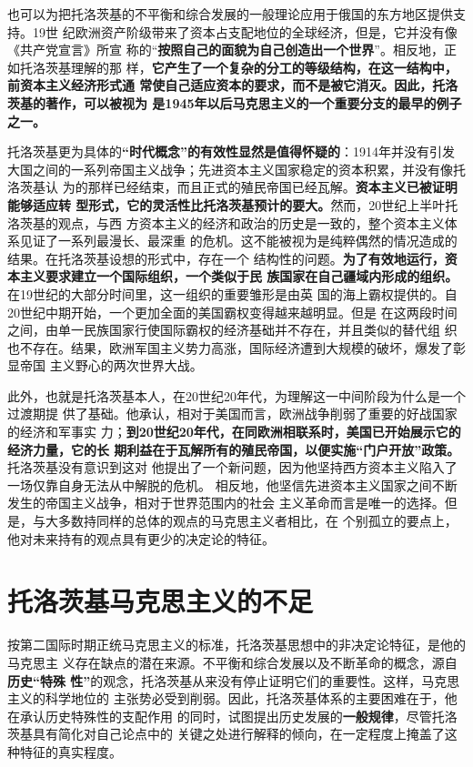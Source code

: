 也可以为把托洛茨基的不平衡和综合发展的一般理论应用于俄国的东方地区提供支持。19世
纪欧洲资产阶级带来了资本占支配地位的全球经济，但是，它并没有像《共产党宣言》所宣
称的“\textbf{按照自己的面貌为自己创造出一个世界}”。相反地，正如托洛茨基理解的那
样，\textbf{它产生了一个复杂的分工的等级结构，在这一结构中，前资本主义经济形式通
  常使自己适应资本的要求，而不是被它消灭。因此，托洛茨基的著作，可以被视为
  是1945年以后马克思主义的一个重要分支的最早的例子之一。}

托洛茨基更为具体的\textbf{“时代概念”的有效性显然是值得怀疑的}：1914年并没有引发
大国之间的一系列帝国主义战争；先进资本主义国家稳定的资本积累，并没有像托洛茨基认
为的那样已经结束，而且正式的殖民帝国已经瓦解。\textbf{资本主义已被证明能够适应转
  型形式，它的灵活性比托洛茨基预计的要大。}然而，20世纪上半叶托洛茨基的观点，与西
方资本主义的经济和政治的历史是一致的，整个资本主义体系见证了一系列最漫长、最深重
的危机。这不能被视为是纯粹偶然的情况造成的结果。在托洛茨基设想的形式中，存在一个
结构性的问题。\textbf{为了有效地运行，资本主义要求建立一个国际组织，一个类似于民
  族国家在自己疆域内形成的组织。}在19世纪的大部分时间里，这一组织的重要雏形是由英
国的海上霸权提供的。自20世纪中期开始，一个更加全面的美国霸权变得越来越明显。但是
在这两段时间之间，由单一民族国家行使国际霸权的经济基础并不存在，并且类似的替代组
织也不存在。结果，欧洲军国主义势力高涨，国际经济遭到大规模的破坏，爆发了彰显帝国
主义野心的两次世界大战。

此外，也就是托洛茨基本人，在20世纪20年代，为理解这一中间阶段为什么是一个过渡期提
供了基础。他承认，相对于美国而言，欧洲战争削弱了重要的好战国家的经济和军事实
力；\textbf{到20世纪20年代，在同欧洲相联系时，美国已开始展示它的经济力量，它的长
  期利益在于瓦解所有的殖民帝国，以便实施“门户开放”政策。}托洛茨基没有意识到这对
他提出了一个新问题，因为他坚持西方资本主义陷入了一场仅靠自身无法从中解脱的危机。
相反地，他坚信先进资本主义国家之间不断发生的帝国主义战争，相对于世界范围内的社会
主义革命而言是唯一的选择。但是，与大多数持同样的总体的观点的马克思主义者相比，在
个别孤立的要点上，他对未来持有的观点具有更少的决定论的特征。

\section{托洛茨基马克思主义的不足}

按第二国际时期正统马克思主义的标准，托洛茨基思想中的非决定论特征，是他的马克思主
义存在缺点的潜在来源。不平衡和综合发展以及不断革命的概念，源自\textbf{历史“特殊
性”}的观念，托洛茨基从来没有停止证明它们的重要性。这样，马克思主义的科学地位的
主张势必受到削弱。因此，托洛茨基体系的主要困难在于，他在承认历史特殊性的支配作用
的同时，试图提出历史发展的\textbf{一般规律}，尽管托洛茨基具有简化对自己论点中的
关键之处进行解释的倾向，在一定程度上掩盖了这种特征的真实程度。

